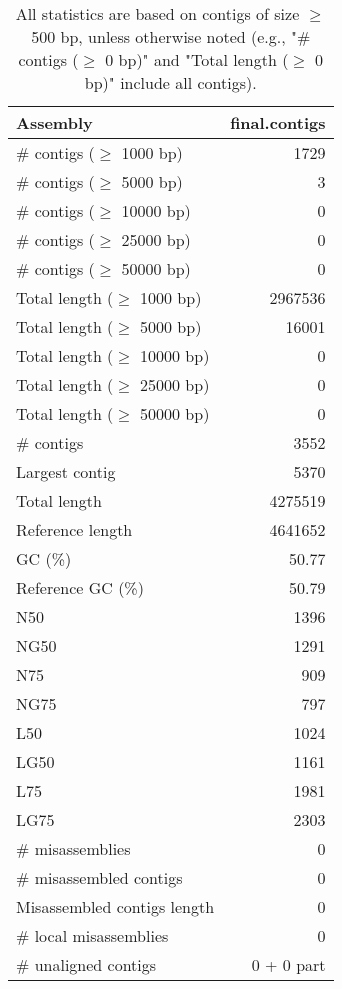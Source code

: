 \documentclass[12pt,a4paper]{article}
\begin{document}
\begin{table}[ht]
\begin{center}
\caption{All statistics are based on contigs of size $\geq$ 500 bp, unless otherwise noted (e.g., "\# contigs ($\geq$ 0 bp)" and "Total length ($\geq$ 0 bp)" include all contigs).}
\begin{tabular}{|l*{1}{|r}|}
\hline
Assembly & final.contigs \\ \hline
\# contigs ($\geq$ 1000 bp) & 1729 \\ \hline
\# contigs ($\geq$ 5000 bp) & 3 \\ \hline
\# contigs ($\geq$ 10000 bp) & 0 \\ \hline
\# contigs ($\geq$ 25000 bp) & 0 \\ \hline
\# contigs ($\geq$ 50000 bp) & 0 \\ \hline
Total length ($\geq$ 1000 bp) & 2967536 \\ \hline
Total length ($\geq$ 5000 bp) & 16001 \\ \hline
Total length ($\geq$ 10000 bp) & 0 \\ \hline
Total length ($\geq$ 25000 bp) & 0 \\ \hline
Total length ($\geq$ 50000 bp) & 0 \\ \hline
\# contigs & 3552 \\ \hline
Largest contig & 5370 \\ \hline
Total length & 4275519 \\ \hline
Reference length & 4641652 \\ \hline
GC (\%) & 50.77 \\ \hline
Reference GC (\%) & 50.79 \\ \hline
N50 & 1396 \\ \hline
NG50 & 1291 \\ \hline
N75 & 909 \\ \hline
NG75 & 797 \\ \hline
L50 & 1024 \\ \hline
LG50 & 1161 \\ \hline
L75 & 1981 \\ \hline
LG75 & 2303 \\ \hline
\# misassemblies & 0 \\ \hline
\# misassembled contigs & 0 \\ \hline
Misassembled contigs length & 0 \\ \hline
\# local misassemblies & 0 \\ \hline
\# unaligned contigs & 0 + 0 part \\ \hline

\end{tabular}
\end{center}
\end{table}
\end{document}
